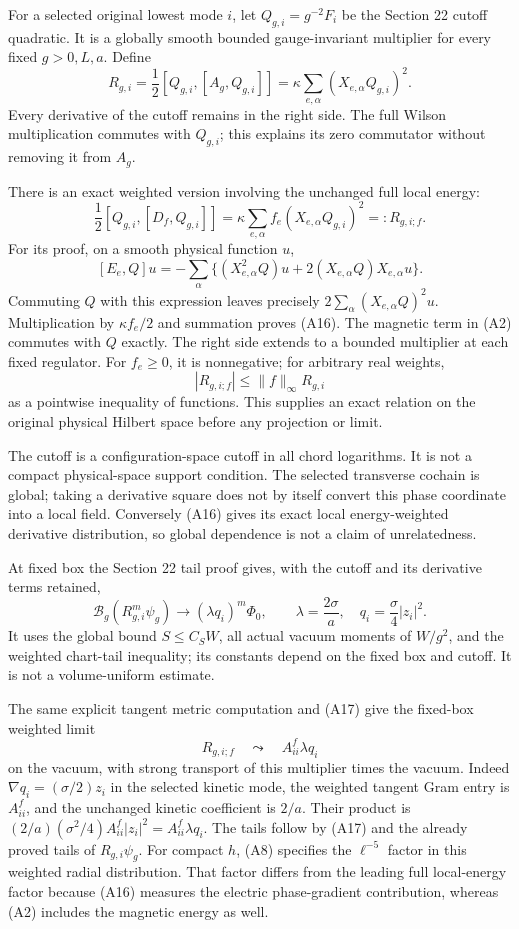 \documentclass[
  11pt,
]{article}
\begin{document}
For a selected original lowest mode \(i\), let \(Q_{g,i}=g^{-2}F_i\) be
the Section 22 cutoff quadratic. It is a globally smooth bounded
gauge-invariant multiplier for every fixed \(g>0,L,a\). Define \[
 R_{g,i}=\frac12[Q_{g,i},[A_g,Q_{g,i}]]
        =\kappa\sum_{e,\alpha}(X_{e,\alpha}Q_{g,i})^2.
\tag{A15}
\] Every derivative of the cutoff remains in the right side. The full
Wilson multiplication commutes with \(Q_{g,i}\); this explains its zero
commutator without removing it from \(A_g\).

There is an exact weighted version involving the unchanged full local
energy: \[
 \boxed{\frac12[Q_{g,i},[D_f,Q_{g,i}]]
       =\kappa\sum_{e,\alpha} f_e(X_{e,\alpha}Q_{g,i})^2
       =:R_{g,i;f}.}
\tag{A16}
\] For its proof, on a smooth physical function \(u\), \[
 [E_e,Q]u=-\sum_\alpha\{(X_{e,\alpha}^2Q)u
                    +2(X_{e,\alpha}Q)X_{e,\alpha}u\}.
\] Commuting \(Q\) with this expression leaves precisely
\(2\sum_\alpha(X_{e,\alpha}Q)^2u\). Multiplication by \(\kappa f_e/2\)
and summation proves (A16). The magnetic term in (A2) commutes with
\(Q\) exactly. The right side extends to a bounded multiplier at each
fixed regulator. For \(f_e\ge0\), it is nonnegative; for arbitrary real
weights, \[
 |R_{g,i;f}|\le\|f\|_\infty R_{g,i}
\tag{A17}
\] as a pointwise inequality of functions. This supplies an exact
relation on the original physical Hilbert space before any projection or
limit.

The cutoff is a configuration-space cutoff in all chord logarithms. It
is not a compact physical-space support condition. The selected
transverse cochain is global; taking a derivative square does not by
itself convert this phase coordinate into a local field. Conversely
(A16) gives its exact local energy-weighted derivative distribution, so
global dependence is not a claim of unrelatedness.

At fixed box the Section 22 tail proof gives, with the cutoff and its
derivative terms retained, \[
 \mathcal B_g(R_{g,i}^m\psi_g)\longrightarrow
 (\lambda q_i)^m\Phi_0,\qquad
 \lambda=\frac{2\sigma}{a},\quad q_i=\frac\sigma4|z_i|^2.
\tag{A18}
\] It uses the global bound \(S\le C_SW\), all actual vacuum moments of
\(W/g^2\), and the weighted chart-tail inequality; its constants depend
on the fixed box and cutoff. It is not a volume-uniform estimate.

The same explicit tangent metric computation and (A17) give the
fixed-box weighted limit \[
 R_{g,i;f}\quad\leadsto\quad A^f_{ii}\lambda q_i
\tag{A19}
\] on the vacuum, with strong transport of this multiplier times the
vacuum. Indeed \(\nabla q_i=(\sigma/2)z_i\) in the selected kinetic
mode, the weighted tangent Gram entry is \(A^f_{ii}\), and the unchanged
kinetic coefficient is \(2/a\). Their product is
\((2/a)(\sigma^2/4)A^f_{ii}|z_i|^2=A^f_{ii}\lambda q_i\). The tails
follow by (A17) and the already proved tails of \(R_{g,i}\psi_g\). For
compact \(h\), (A8) specifies the \(\ell^{-5}\) factor in this weighted
radial distribution. That factor differs from the leading full
local-energy factor because (A16) measures the electric phase-gradient
contribution, whereas (A2) includes the magnetic energy as well.
\end{document}
